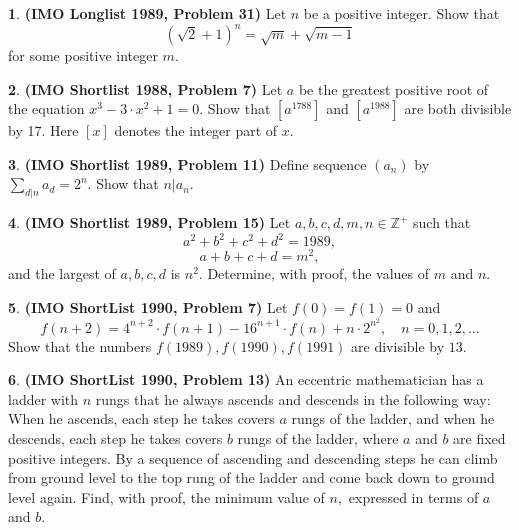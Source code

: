 \documentclass{article}
\newcommand{\plus}{+}
\newcommand{\minus}{-}
\newcommand{\equal}{=}
\theoremstyle{definition}
\newtheorem{p}{}
\begin{document}
\begin{p}{\bf (IMO Longlist 1989, Problem 31)}
Let $ n$ be a positive integer. Show that \[ \left(\sqrt{2} \plus{} 1 \right)^n \equal{} \sqrt{m} \plus{} \sqrt{m\minus{}1}\] for some positive integer $ m.$
\end{p}





\begin{p}{\bf (IMO Shortlist 1988, Problem 7)}
Let $ a$ be the greatest positive root of the equation $ x^3 \minus{} 3 \cdot x^2 \plus{} 1 \equal{} 0.$ Show that $ \left[a^{1788} \right]$ and $ \left[a^{1988} \right]$ are both divisible by 17. Here $ [x]$ denotes the integer part of $ x.$
\end{p}




\begin{p}{\bf (IMO Shortlist 1989, Problem 11)}
Define sequence $ (a_n)$ by $ \sum_{d|n} a_d \equal{} 2^n.$ Show that $ n|a_n.$
\end{p}



\begin{p}{\bf (IMO Shortlist 1989, Problem 15)}
Let $ a, b, c, d,m, n \in \mathbb{Z}^\plus{}$ such that \[ a^2\plus{}b^2\plus{}c^2\plus{}d^2 \equal{} 1989,\]
\[ a\plus{}b\plus{}c\plus{}d \equal{} m^2,\] and the largest of $ a, b, c, d$ is $ n^2.$ Determine, with proof, the values  of $m$ and $ n.$
\end{p}





\begin{p}{\bf (IMO ShortList 1990, Problem 7)}
Let $ f(0) \equal{} f(1) \equal{} 0$ and
\[ f(n\plus{}2) \equal{} 4^{n\plus{}2} \cdot  f(n\plus{}1) \minus{} 16^{n\plus{}1} \cdot f(n) \plus{} n \cdot 2^{n^2}, \quad n \equal{} 0, 1, 2, \ldots\]
Show that the numbers $ f(1989), f(1990), f(1991)$ are divisible by $ 13.$
\end{p}





\begin{p}{\bf (IMO ShortList 1990, Problem 13)}
An eccentric mathematician has a ladder with $ n$ rungs that he always ascends and descends in the following way: When he ascends, each step he takes covers $ a$ rungs of the ladder, and when he descends, each step he takes covers $ b$ rungs of the ladder, where $ a$ and $ b$ are fixed positive integers. By a sequence of ascending and descending steps he can climb from ground level to the top rung of the ladder and come back down to ground level again. Find, with proof, the minimum value of $ n,$ expressed in terms of $ a$ and $ b.$
\end{p}
\end{document}
